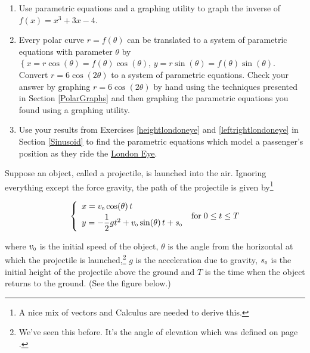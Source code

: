 \begin{enumerate}

\setcounter{enumi}{\value{HW}}

\item Use parametric equations and a graphing utility to graph the inverse of $f(x) = x^{3} + 3x - 4$.

\item  Every polar curve $r = f(\theta)$ can be translated to a system of parametric equations with parameter $\theta$ by $\left\{ x = r\cos(\theta) = f(\theta) \cos(\theta), \, y = r \sin(\theta) = f(\theta) \sin(\theta) \right.$.  Convert $r = 6\cos(2\theta)$ to a system of parametric equations. Check your answer by graphing $r = 6\cos(2\theta)$ by hand using the techniques presented in Section \ref{PolarGraphs} and then graphing the parametric equations you found using a graphing utility.


\item  Use your results from Exercises \ref{heightlondoneye} and \ref{leftrightlondoneye} in Section \ref{Sinusoid} to find the parametric equations which model a passenger's position as they ride the \href{http://en.wikipedia.org/wiki/London_Eye}{\underline{London Eye}}. 




\setcounter{HW}{\value{enumi}}
\end{enumerate}

\label{projectoilemotion}

Suppose an object, called a projectile, is launched into the air.  Ignoring everything except the force gravity, the path of the projectile is given by\footnote{A nice mix of vectors and Calculus are needed to derive this.}

\[ \left\{ \begin{array}{l} x =   v_{\text{\tiny $0$}} \cos(\theta) \, t \\ [3pt]
															y = -\dfrac{1}{2} g t^2 +  v_{\text{\tiny $0$}} \sin(\theta) \, t + s_{\text{\tiny $0$}} \\ \end{array} \right. \; \text{for} \; 0 \leq t \leq T \]

where  $v_{\text{\tiny $0$}}$ is the initial speed of the object, $\theta$ is the angle from the horizontal at which the projectile is launched,\footnote{We've seen this before.  It's the angle of elevation which was defined on page \pageref{angleofelevation}.} $g$ is the acceleration due to gravity,  $s_{\text{\tiny $0$}}$ is the initial height of the projectile above the ground and $T$ is the time when the object returns to the ground.  (See the figure below.)

